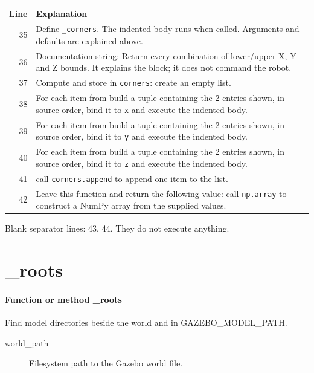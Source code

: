 \documentclass[11pt,a4paper]{book}
\begin{document}
\begin{longtable}{r p{}}

\textbf{Line} & \textbf{Explanation} \\ \hline \endhead

35 & Define \texttt{\_corners}. The indented body runs when called. Arguments and defaults are explained above. \\

36 & Documentation string: Return every combination of lower/upper X, Y and Z bounds. It explains the block; it does not command the robot. \\

37 & Compute and store in \texttt{corners}: create an empty list.  \\

38 & For each item from build a tuple containing the 2 entries shown, in source order, bind it to \texttt{x} and execute the indented body. \\

39 & For each item from build a tuple containing the 2 entries shown, in source order, bind it to \texttt{y} and execute the indented body. \\

40 & For each item from build a tuple containing the 2 entries shown, in source order, bind it to \texttt{z} and execute the indented body. \\

41 & call \texttt{corners.append} to append one item to the list. \\

42 & Leave this function and return the following value: call \texttt{np.array} to construct a NumPy array from the supplied values. \\

\end{longtable}

Blank separator lines: 43, 44. They do not execute anything.

\section{\_roots}

\paragraph{Function or method \_roots}
Find model directories beside the world and in GAZEBO\_MODEL\_PATH.

\begin{description}
\item[world\_path] Filesystem path to the Gazebo world file.
\end{description}
\end{document}
